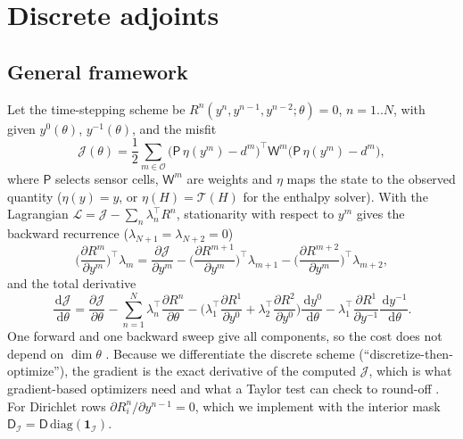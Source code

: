\documentclass[11pt]{article}
\numberwithin{equation}{section}
\theoremstyle{remark}
\newcommand{\dd}{\,\mathrm{d}}
\newcommand{\Dm}{\mathsf{D}}           %
\newcommand{\Pobs}{\mathsf{P}}
\begin{document}
\section{Discrete adjoints}
\label{sec:adjoints}

\subsection{General framework}

Let the time-stepping scheme be $R^n(y^n,y^{n-1},y^{n-2};\theta)=0$,
$n=1..N$, with given $y^0(\theta)$, $y^{-1}(\theta)$, and the misfit
\begin{equation}
  \mathcal J(\theta) = \frac12\sum_{m\in\mathcal O}\big(\Pobs\,\eta(y^m)-d^m\big)^{\!\top}
  \mathsf W^m\big(\Pobs\,\eta(y^m)-d^m\big),
  \label{eq:misfit}
\end{equation}
where $\Pobs$ selects sensor cells, $\mathsf W^m$ are weights and $\eta$ maps
the state to the observed quantity ($\eta(y)=y$, or $\eta(H)=\mathcal T(H)$ for
the enthalpy solver).  With the Lagrangian
$\mathcal L=\mathcal J-\sum_n\lambda_n^{\!\top}R^n$, stationarity with respect to
$y^m$ gives the backward recurrence ($\lambda_{N+1}=\lambda_{N+2}=0$)
\begin{equation}
  \Big(\frac{\partial R^m}{\partial y^m}\Big)^{\!\top}\lambda_m
  = \frac{\partial\mathcal J}{\partial y^m}
  - \Big(\frac{\partial R^{m+1}}{\partial y^m}\Big)^{\!\top}\lambda_{m+1}
  - \Big(\frac{\partial R^{m+2}}{\partial y^m}\Big)^{\!\top}\lambda_{m+2},
  \label{eq:adjoint-recurrence}
\end{equation}
and the total derivative
\begin{equation}
  \frac{\dd\mathcal J}{\dd\theta} = \frac{\partial\mathcal J}{\partial\theta}
  - \sum_{n=1}^N\lambda_n^{\!\top}\frac{\partial R^n}{\partial\theta}
  - \Big(\lambda_1^{\!\top}\frac{\partial R^1}{\partial y^0}+\lambda_2^{\!\top}\frac{\partial R^2}{\partial y^0}\Big)\frac{\dd y^0}{\dd\theta}
  - \lambda_1^{\!\top}\frac{\partial R^1}{\partial y^{-1}}\frac{\dd y^{-1}}{\dd\theta}.
  \label{eq:gradient}
\end{equation}
One forward and one backward sweep give all components, so the cost does not
depend on $\dim\theta$ \cite{giles2000,gunzburger2003}.  Because we
differentiate the discrete scheme (``discretize-then-optimize''), the gradient
is the exact derivative of the computed $\mathcal J$, which is what
gradient-based optimizers need and what a Taylor test can check to round-off
\cite{farrell2013}.  For Dirichlet rows $\partial R_i^n/\partial y^{n-1}=0$, which
we implement with the interior mask $\Dm_{\mathcal I}=\Dm\,\mathrm{diag}(\mathbf 1_{\mathcal I})$.
\end{document}
